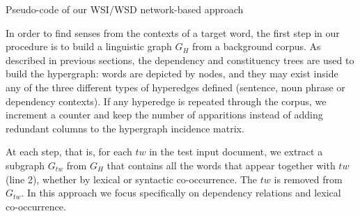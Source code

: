 \begin{algorithm}[!htp]
\SetAlgoLined
{}


\caption{Pseudo-code of our WSI/WSD network-based approach}
\label{alg:wsd}
\end{algorithm}


In order to find senses from the contexts of a target word, the first step in our procedure is to build a linguistic graph $G_H$ from a background corpus. As described in previous sections, the dependency and constituency trees are used to build the hypergraph: words are depicted by nodes, and they may exist inside any of the three different types of hyperedges defined (sentence,  noun phrase or dependency contexts). If any  hyperedge is repeated through the corpus, we increment a counter and keep the number of apparitions instead of adding redundant columns to the hypergraph incidence matrix.

At each step, that is, for each $tw$ in the test input document, we extract a subgraph $G_{tw}$ from $G_H$ that contains all the words that appear together with $tw$ (line 2), whether by lexical or syntactic co-occurrence. The $tw$ is removed from $G_{tw}$. In this approach we focus specifically on dependency relations and lexical co-occurrence. 

